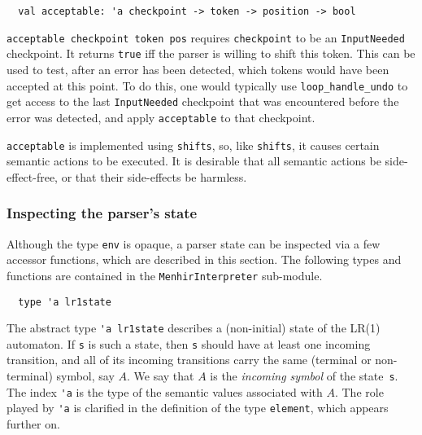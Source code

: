 \documentclass[onecolumn,11pt,nocopyrightspace,preprint]{sigplanconf}
\begin{document}

\begin{verbatim}
  val acceptable: 'a checkpoint -> token -> position -> bool
\end{verbatim}

\verb+acceptable checkpoint token pos+ requires \verb+checkpoint+ to be an
\verb+InputNeeded+ checkpoint. It returns \verb+true+ iff the parser is
willing to shift this token.
%
This can be used to test, after an error has been detected, which tokens would
have been accepted at this point. To do this, one would typically use
\verb+loop_handle_undo+ to get access to the last \verb+InputNeeded+
checkpoint that was encountered before the error was detected, and apply
\verb+acceptable+ to that checkpoint.

\verb+acceptable+ is implemented using \verb+shifts+, so, like \verb+shifts+,
it causes certain semantic actions to be executed. It is desirable that all
semantic actions be side-effect-free, or that their side-effects be harmless.


\subsubsection{Inspecting the parser's state}
\label{sec:incremental:inspecting}

Although the type \verb+env+ is opaque, a parser state can be inspected via a
few accessor functions, which are described in this section. The following
types and functions are contained in the \verb+MenhirInterpreter+ sub-module.


\begin{verbatim}
  type 'a lr1state
\end{verbatim}

The abstract type \verb+'a lr1state+ describes a (non-initial) state of the
LR(1) automaton.
%
If \verb+s+ is such a state, then \verb+s+ should have at least one incoming
transition, and all of its incoming transitions carry the same (terminal or
non-terminal) symbol, say $A$. We say that $A$ is the \emph{incoming symbol}
of the state~\verb+s+.
%
The index \verb+'a+ is the type of the semantic values associated with $A$.
The role played by \verb+'a+ is clarified in the definition of the
type \verb+element+, which appears further on.

\end{document}
